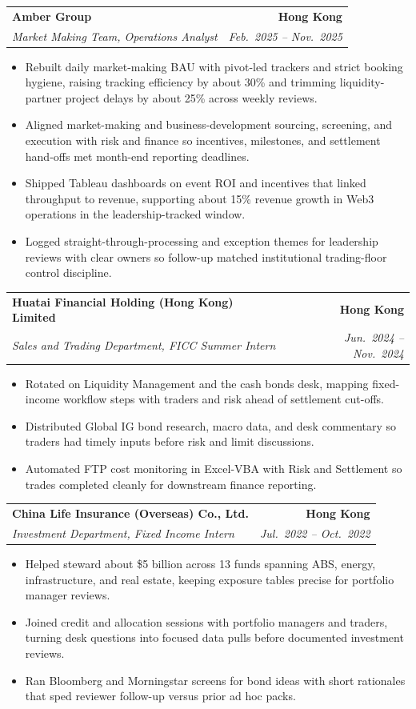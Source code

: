 \documentclass[9pt,a4paper]{extarticle}
\makeatletter
\newcommand{\resumeSubheading}[4]{%
  \vspace{0.6em}%
  \begin{tabular*}{\textwidth}{l@{\extracolsep{\fill}}r}
    \textbf{#1} & \textbf{#2} \\
    \textit{\small #3} & \textit{\small #4} \\
  \end{tabular*}\vspace{0.32em}}
\makeatother
\begin{document}
\resumeSubheading{Amber Group}{Hong Kong}{Market Making Team, Operations Analyst}{Feb.\ 2025 -- Nov.\ 2025}
\begin{itemize}
  \item Rebuilt daily market-making BAU with pivot-led trackers and strict booking hygiene, raising tracking efficiency by about 30\% and trimming liquidity-partner project delays by about 25\% across weekly reviews.
  \item Aligned market-making and business-development sourcing, screening, and execution with risk and finance so incentives, milestones, and settlement hand-offs met month-end reporting deadlines.
  \item Shipped Tableau dashboards on event ROI and incentives that linked throughput to revenue, supporting about 15\% revenue growth in Web3 operations in the leadership-tracked window.
  \item Logged straight-through-processing and exception themes for leadership reviews with clear owners so follow-up matched institutional trading-floor control discipline.
\end{itemize}

\resumeSubheading{Huatai Financial Holding (Hong Kong) Limited}{Hong Kong}{Sales and Trading Department, FICC Summer Intern}{Jun.\ 2024 -- Nov.\ 2024}
\begin{itemize}
  \item Rotated on Liquidity Management and the cash bonds desk, mapping fixed-income workflow steps with traders and risk ahead of settlement cut-offs.
  \item Distributed Global IG bond research, macro data, and desk commentary so traders had timely inputs before risk and limit discussions.
  \item Automated FTP cost monitoring in Excel-VBA with Risk and Settlement so trades completed cleanly for downstream finance reporting.
\end{itemize}

\resumeSubheading{China Life Insurance (Overseas) Co., Ltd.}{Hong Kong}{Investment Department, Fixed Income Intern}{Jul.\ 2022 -- Oct.\ 2022}
\begin{itemize}
  \item Helped steward about \$5 billion across 13 funds spanning ABS, energy, infrastructure, and real estate, keeping exposure tables precise for portfolio manager reviews.
  \item Joined credit and allocation sessions with portfolio managers and traders, turning desk questions into focused data pulls before documented investment reviews.
  \item Ran Bloomberg and Morningstar screens for bond ideas with short rationales that sped reviewer follow-up versus prior ad hoc packs.
\end{itemize}
\end{document}

